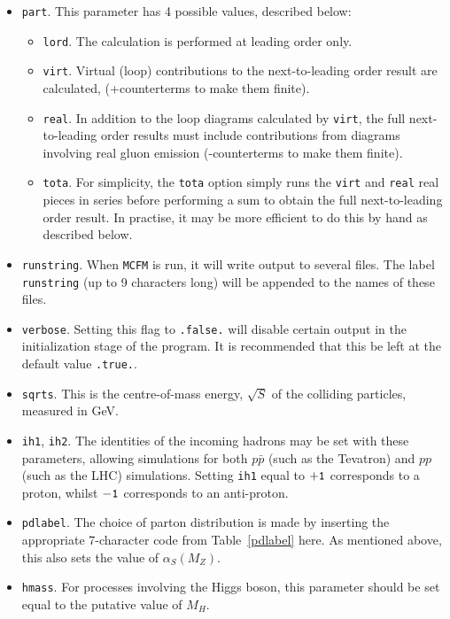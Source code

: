 \documentclass[12pt]{article}
\begin{document}
\begin{itemize}
\item {\tt part}.
This parameter has 4 possible values, described below:
\begin{itemize}
\item {\tt lord}.
The calculation is performed at leading order only.
\item {\tt virt}.
Virtual (loop) contributions to the next-to-leading order result are
calculated, (+counterterms to make them finite).
\item {\tt real}.
In addition to the loop diagrams calculated by {\tt virt}, the full
next-to-leading order results must include contributions from diagrams
involving real gluon emission (-counterterms to make them finite).
\item {\tt tota}.
For simplicity, the {\tt tota} option simply runs the {\tt virt} and
{\tt real} real pieces in series before performing a sum to obtain
the full next-to-leading order result. In practise, it may be more
efficient to do this by hand as described below.
\end{itemize}

\item {\tt runstring}.
When {\tt MCFM} is run, it will write output to several files. The
label {\tt runstring} (up to 9 characters long) will be appended
to the names of these files.

\item {\tt verbose}.
Setting this flag to {\tt .false.} will disable certain output in
the initialization stage of the program. It is recommended that
this be left at the default value {\tt .true.}.

\item {\tt sqrts}. This is the centre-of-mass energy, $\sqrt{S}$ of
the colliding particles, measured in GeV.

\item {\tt ih1}, {\tt ih2}. The identities of the incoming hadrons
may be set with these parameters, allowing simulations for both
$p{\bar p}$ (such as the Tevatron) and $pp$ (such as the LHC)
simulations. Setting {\tt ih1} equal to ${\tt +1}$ corresponds to
a proton, whilst ${\tt -1}$ corresponds to an anti-proton.

\item {\tt pdlabel}. The choice of parton distribution is made by
inserting the appropriate 7-character code from Table~{\ref{pdlabel}}
here. As mentioned above, this also sets the value of $\alpha_S(M_Z)$.

\item {\tt hmass}. For processes involving the Higgs boson, this
parameter should be set equal to the putative value of $M_H$.


\end{itemize}
\end{document}
